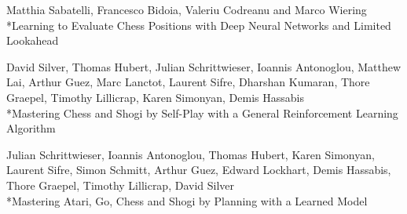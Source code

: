 \documentclass[runningheads,a4paper,11pt]{report}
\begin{document}
\begin{thebibliography}{3}

Matthia Sabatelli, Francesco Bidoia, Valeriu Codreanu and Marco Wiering
\\*Learning to Evaluate Chess Positions with Deep Neural Networks and Limited Lookahead

David Silver, Thomas Hubert, Julian Schrittwieser, Ioannis Antonoglou, Matthew Lai, Arthur Guez, Marc Lanctot,
Laurent Sifre, Dharshan Kumaran, Thore Graepel,
Timothy Lillicrap, Karen Simonyan, Demis Hassabis
\\*Mastering Chess and Shogi by Self-Play with a General Reinforcement Learning Algorithm

Julian Schrittwieser, Ioannis Antonoglou, Thomas Hubert, 
Karen Simonyan, Laurent Sifre, Simon Schmitt, Arthur Guez, 
Edward Lockhart, Demis Hassabis, Thore Graepel, Timothy Lillicrap, 
David Silver
\\*Mastering Atari, Go, Chess and Shogi by Planning with a
Learned Model

\end{thebibliography}
\end{document}
